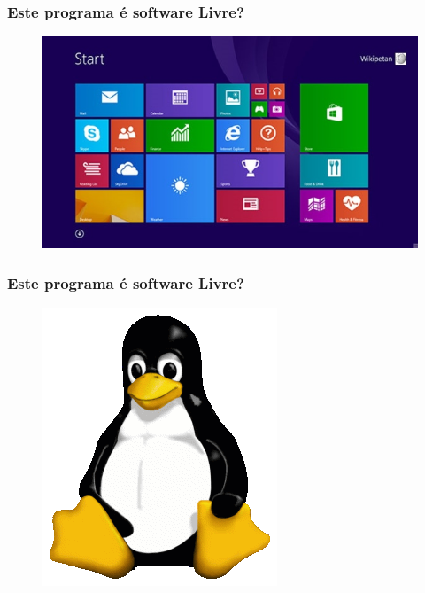 \documentclass[xcolor=dvipsnames]{beamer}
\begin{document}
\begin{frame}
	\frametitle{Este programa é software Livre?}
	\begin{figure}
	\includegraphics[scale=0.60]{windows8.jpg}\\
	\end{figure}	
\end{frame}

\begin{frame}
	\frametitle{Este programa é software Livre?}
	\begin{figure}
	\includegraphics[scale=0.45]{tux.png}\\
	\end{figure}	
\end{frame}
\end{document}
